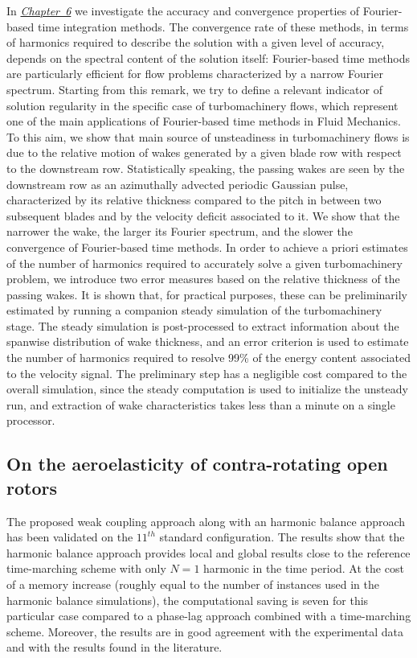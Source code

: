 In \hyperref[cha:limitations_convergence]{\emph{Chapter~6}}
we investigate the accuracy and convergence properties 
of Fourier-based time integration methods. The convergence rate 
of these methods, in terms of harmonics required to describe the solution 
with a given level of accuracy, depends on the spectral content of the 
solution itself: Fourier-based time methods are particularly efficient 
for flow problems characterized by a narrow Fourier 
spectrum. Starting from this remark, we try to define a relevant 
indicator of solution regularity in the specific case of turbomachinery 
flows, which represent one of the main applications of Fourier-based 
time methods in Fluid Mechanics.
To this aim, we show that main source of unsteadiness in 
turbomachinery flows is due to the relative motion of wakes 
generated by a given blade row with respect to the downstream row. 
Statistically speaking, the passing wakes are seen by the downstream 
row as an azimuthally advected periodic Gaussian pulse, 
characterized by its relative thickness compared to the pitch 
in between two subsequent blades and by the velocity deficit 
associated to it. We show that the narrower the wake, the larger 
its Fourier spectrum, and the slower the convergence of Fourier-based time methods.
In order to achieve a priori estimates of the number of 
harmonics required to accurately solve a given turbomachinery 
problem, we introduce two error measures based on the relative 
thickness of the passing wakes. It is shown that, for practical 
purposes, these can be preliminarily estimated by running a 
companion steady simulation of the turbomachinery stage. The 
steady simulation is post-processed to extract information about 
the spanwise distribution of wake thickness, and an error criterion 
is used to estimate the number of harmonics required to resolve 99\% 
of the energy content associated to the velocity signal. The 
preliminary step has a negligible cost compared to the overall 
simulation, since the steady computation is used to initialize 
the unsteady run, and extraction of wake characteristics takes 
less than a minute on a single processor. 

\subsection*{On the aeroelasticity of contra-rotating open rotors}

The proposed weak coupling approach along with
an harmonic balance approach has been
validated on the $11^{th}$ standard configuration. 
The results show that the harmonic balance approach provides local
and global results close to the reference time-marching scheme 
with only $N=1$ harmonic in the time period. At the cost of a memory
increase (roughly equal to the number of instances used in the harmonic balance
simulations), the computational saving is seven for this
particular case compared to a phase-lag approach combined
with a time-marching scheme. 
Moreover, the results are
in good agreement with the experimental data and with the results
found in the literature.





